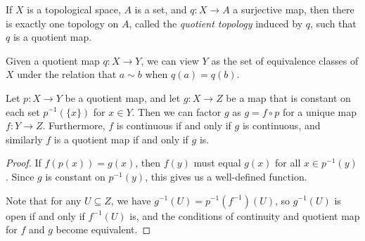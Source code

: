 \begin{defn}
    If $X$ is a topological space, $A$ is a set, and $q: X \to A$ a surjective map, then there is exactly one topology on $A$, called the \emph{quotient topology} induced by $q$, such that $q$ is a quotient map.
\end{defn}

\begin{rmk}
    Given a quotient map $q: X \to Y$, we can view $Y$ as the set of equivalence classes of $X$ under the relation that $a \sim b$ when $q(a) = q(b)$.
\end{rmk}

\begin{thm}
    Let $p: X \to Y$ be a quotient map, and let $g: X \to Z$ be a map that is constant on each set $p^{-1}(\{x\})$ for $x \in Y$. Then we can factor $g$ as $g = f \circ p$ for a unique map $f: Y \to Z$. Furthermore, $f$ is continuous if and only if $g$ is continuous, and similarly $f$ is a quotient map if and only if $g$ is.
\end{thm}

\begin{proof}
    If $f(p(x)) = g(x)$, then $f(y)$ must equal $g(x)$ for all $x \in p^{-1}(y)$. Since $g$ is constant on $p^{-1}(y)$, this gives us a well-defined function.

    Note that for any $U \subseteq Z$, we have $g^{-1}(U) = p^{-1}(f^{-1})(U)$, so $g^{-1}(U)$ is open if and only if $f^{-1}(U)$ is, and the conditions of continuity and quotient map for $f$ and $g$ become equivalent.
\end{proof}
